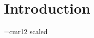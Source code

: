 \documentclass[11pt,a4paper,twoside]{carrollthesis}
\begin{document}
% 


\setcounter{page}{1}
\pagestyle{mystyle}
% 
% 
% 
% 
% 
% 

% 
% 
%
%
%

% 
% 
%
% 
%
%
%
%
%

%

\chapter{Introduction} \label{sec:introduction}
%

\font\dropcapfnt=cmr12 scaled 

\def\dropcap#1{\smallbreak \setbox0=\hbox{\dropcapfnt#1}
 \dimen0=\ht0 \setbox1=\hbox{t} \advance\dimen0 by-\ht1
 \dimen1=\wd0 \advance\dimen1 by 0.3em
 \hangindent\dimen1 \hangafter-2
 \noindent\smash{\llap{\lower\dimen0\box0\hskip0.3em}}%
  \kern-0.0em }
\end{document}
